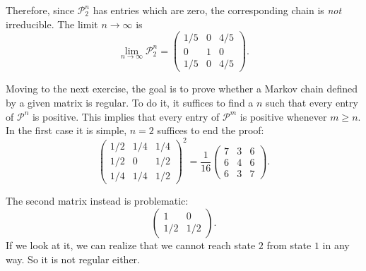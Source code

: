 \documentclass{gulartcl}
\begin{document}
Therefore, since $\mathcal{P}_{2}^{n}$ has entries which are zero, the
corresponding chain is \emph{not} irreducible. The limit $n \to \infty$ is
\begin{equation}
    \lim_{n \to \infty} \mathcal{P}_{2}^{n} =
    \begin{pmatrix}
        1/5 & 0 & 4/5 \\
        0 & 1 & 0 \\
        1/5 & 0 & 4/5
    \end{pmatrix}.
\end{equation}

Moving to the next exercise, the goal is to prove whether a Markov chain defined
by a given matrix is regular. To do it, it suffices to find a $n$ such that
every entry of $\mathcal{P}^{n}$ is positive. This implies that every entry of
$\mathcal{P}^{m}$ is positive whenever $m \geq n$. In the first case it is
simple, $n = 2$ suffices to end the proof:
\begin{equation}
    \begin{pmatrix}
        1/2 & 1/4 & 1/4 \\
        1/2 &  0  & 1/2 \\
        1/4 & 1/4 & 1/2
    \end{pmatrix}^2
    = \frac{1}{16}
    \begin{pmatrix}
        7 & 3 & 6 \\
        6 & 4 & 6 \\
        6 & 3 & 7
    \end{pmatrix}.
\end{equation}

The second matrix instead is problematic:
\begin{equation}
    \begin{pmatrix}
        1 & 0 \\
        1/2 & 1/2
    \end{pmatrix}.
\end{equation}
If we look at it, we can realize that we cannot reach state $2$ from state $1$
in any way. So it is not regular either.
\end{document}
